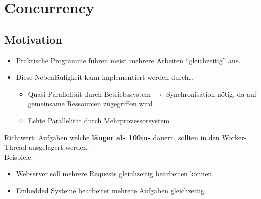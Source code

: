 \section{Concurrency}

\subsection{Motivation}
\begin{itemize}
  \item Praktische Programme führen meist mehrere Arbeiten "`gleichzeitig"' aus. 
  \item Diese Nebenläufigkeit kann implementiert werden durch\ldots
  \begin{itemize}
    \item Quasi-Parallelität durch Betriebssystem $\rightarrow$ Synchronisation
    nötig, da auf gemeinsame Ressourcen zugegriffen wird
    \item Echte Parallelität durch Mehrprozessorsystem
  \end{itemize}
\end{itemize}
Richtwert: Aufgaben welche \textbf{länger als 100ms} dauern, sollten in den Worker-Thread ausgelagert werden.\\
Beispiele:
\begin{itemize}
  \item Webserver soll mehrere Requests gleichzeitig bearbeiten können.
  \item Embedded Systeme bearbeitet mehrere Aufgaben gleichzeitig.
\end{itemize}

